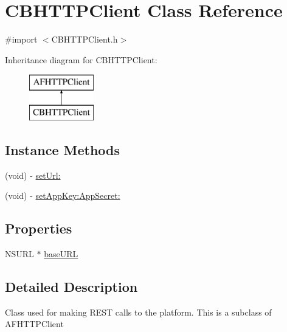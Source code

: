 \hypertarget{interface_c_b_h_t_t_p_client}{\section{C\-B\-H\-T\-T\-P\-Client Class Reference}
\label{interface_c_b_h_t_t_p_client}
}


{\ttfamily \#import $<$C\-B\-H\-T\-T\-P\-Client.\-h$>$}

Inheritance diagram for C\-B\-H\-T\-T\-P\-Client\-:\begin{figure}[H]
\begin{center}
\leavevmode
\includegraphics[height=2.000000cm]{interface_c_b_h_t_t_p_client}
\end{center}
\end{figure}
\subsection*{Instance Methods}
\begin{DoxyCompactItemize}
\item 
(void) -\/ \hyperlink{interface_c_b_h_t_t_p_client_ad5a36148d93216e8f41e81b4f0000d66}{set\-Url\-:}
\item 
(void) -\/ \hyperlink{interface_c_b_h_t_t_p_client_affe94c0f2e4358e5d8717f5af3cbb3e5}{set\-App\-Key\-:\-App\-Secret\-:}
\end{DoxyCompactItemize}
\subsection*{Properties}
\begin{DoxyCompactItemize}
\item 
N\-S\-U\-R\-L $\ast$ \hyperlink{interface_c_b_h_t_t_p_client_a9052e80b6482a3e1242f061b5f412df6}{base\-U\-R\-L}
\end{DoxyCompactItemize}


\subsection{Detailed Description}
Class used for making R\-E\-S\-T calls to the platform. This is a subclass of A\-F\-H\-T\-T\-P\-Client 

